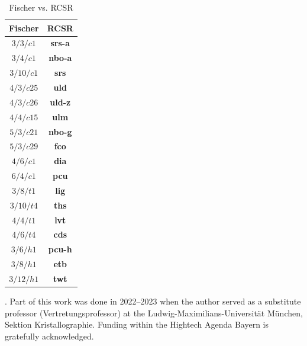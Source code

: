 \documentclass[11pt,a4paper]{article}
\begin{document}
{\tiny
\begin{table}[H]
\begin{center}
\caption{Fischer vs. RCSR}
\label{t:table6}
\begin{tabular}{|c|c|}
\hline
Fischer & RCSR  \\
\hline
$3/3/c1$  & {\bf srs-a} \\
$3/4/c1$  & {\bf nbo-a} \\
$3/10/c1$ & {\bf srs} \\
$4/3/c25$ & {\bf uld} \\
$4/3/c26$ & {\bf uld-z} \\
$4/4/c15$ & {\bf ulm} \\
$5/3/c21$ & {\bf nbo-g} \\
$5/3/c29$ & {\bf fco} \\
$4/6/c1$  & {\bf dia} \\
$6/4/c1$  & {\bf pcu} \\
$3/8/t1$  & {\bf lig} \\
$3/10/t4$ & {\bf ths} \\
$4/4/t1$  & {\bf lvt} \\
$4/6/t4$  & {\bf cds} \\
$3/6/h1$ & {\bf pcu-h} \\
$3/8/h1$  & {\bf etb} \\
$3/12/h1$ & {\bf twt} \\
\hline
\end{tabular}
\end{center}
\end{table}
}



. Part of this work was done in 2022--2023 when the author served as a substitute professor (Vertretungsprofessor) at the Ludwig-Maximilians-Universit\"at M\"unchen, Sektion Kristallographie. Funding within the Hightech Agenda Bayern is gratefully acknowledged.
\end{document}
